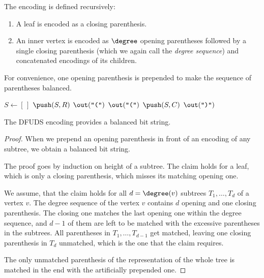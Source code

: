 The encoding is defined recursively:
\begin{enumerate}
	\item A leaf is encoded as a closing parenthesis.
	\item An inner vertex is encoded as $\degree$ opening parentheses followed by a single closing parenthesis (which we again call the \emph{degree sequence}) and concatenated encodings of its children.
\end{enumerate}
For convenience, one opening parenthesis is prepended to make the sequence of parentheses balanced.

\begin{algorithm}
\begin{algorithmic}
	\State $S \gets [\,]$%
	\Instr $\push(S, R)$ 
	\State $\out(\openingParen)$
			\State $\out(\openingParen)$
			\State $\push(S, C)$
		\EndFor
		\State $\out(\closingParen)$
	\EndWhile
\EndFunction
\end{algorithmic}
\end{algorithm}

\begin{lemma}\label{l:dfuds}
	The DFUDS encoding provides a balanced bit string.
\end{lemma}
\begin{proof}
	When we prepend an opening parenthesis in front of an encoding of any subtree, we obtain a balanced bit string.
	
	The proof goes by induction on height of a subtree.
	The claim holds for a leaf, which is only a closing parenthesis, which misses its matching opening one.
	
	We assume, that the claim holds for all $d = \degree(v)$ subtrees $T_1, \ldots, T_d$ of a vertex $v$.
	The degree sequence of the vertex $v$ contains $d$ opening and one closing parenthesis.
	The closing one matches the last opening one within the degree sequence, and $d - 1$ of them are left to be matched with the excessive parentheses in the subtrees.
	All parentheses in $T_1, \ldots, T_{d-1}$ get matched, leaving one closing parenthesis in $T_d$ unmatched, which is the one that the claim requires.
	
	The only unmatched parenthesis of the representation of the whole tree is matched in the end with the artificially prepended one.
\end{proof}

